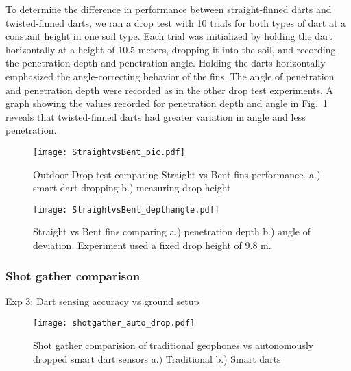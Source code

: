  To determine the difference in performance between straight-finned darts and twisted-finned darts, we ran a drop test with 10 trials for both types of dart at a constant height in one soil type. Each trial was initialized by holding the dart horizontally at a height of 10.5 meters, dropping it into the soil, and recording the penetration depth and penetration angle. Holding the darts horizontally emphasized the angle-correcting behavior of the fins. The angle of penetration and penetration depth were recorded as in the other drop test experiments. A graph showing the values recorded for penetration depth and angle in Fig.~\ref{fig:StraightBentPic} reveals that twisted-finned darts had greater variation in angle and less penetration.
\begin{figure} \centering
  {\texttt{[image: StraightvsBent\_pic.pdf]}}
 \caption{Outdoor Drop test comparing Straight vs Bent fins performance.
 a.)  smart dart dropping 
 b.)  measuring drop height} 
 \label{fig:StraightBentPic}
 \vspace{-1em}
\end{figure}
\begin{figure} \centering
  {\texttt{[image: StraightvsBent\_depthangle.pdf]}}
 \caption{\label{fig:StraightBentDepth}Straight vs Bent fins comparing a.) penetration depth b.) angle of deviation. Experiment used a fixed drop height of 9.8 m.} 
\end{figure}
\subsubsection{Shot gather comparison}
Exp 3: Dart sensing accuracy vs ground setup

\begin{figure} \centering
  {\texttt{[image: shotgather\_auto\_drop.pdf]}}
 \caption{Shot gather comparision of traditional geophones vs autonomously dropped smart dart sensors a.) Traditional b.) Smart darts} 
 \label{fig:TradvsAutoDrop}
\end{figure}


 